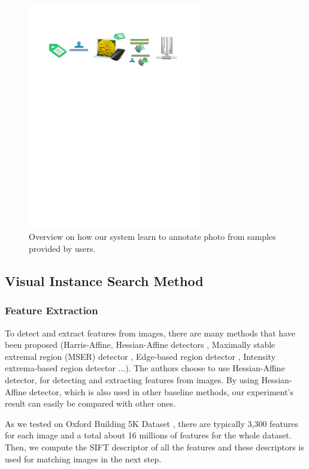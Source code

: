 \begin{figure}
    \centering
    \includegraphics[width=3.0in]{flow2.pdf}
    \caption{Overview on how our system learn to annotate photo from samples provided by users.}
    \label{fig:flow_1}
\end{figure}

\subsection{Visual Instance Search Method} \label{section:visual_search}
\subsubsection{Feature Extraction} \label{section:feature_extraction}

To detect and extract features from images, there are many methods that have been proposed (Harris-Affine, Hessian-Affine detectors \cite{Mikolajczyk2004}, Maximally stable extremal region (MSER) detector \cite{conf/bmvc/MatasCUP02}, Edge-based region detector \cite{Tuytelaars99content-basedimage}, Intensity extrema-based region detector \cite{Tuytelaars00widebaseline} ...). The authors choose to use Hessian-Affine detector, for detecting and extracting features from images. By using Hessian-Affine detector, which is also used in other baseline methods, our experiment's result can easily be compared with other ones.

As we tested on Oxford Building 5K Dataset \cite{oxbuilding}, there are typically 3,300 features for each image and a total about 16 millions of features for the whole dataset. Then, we compute the SIFT descriptor \cite{Lowe2004} of all the features and these descriptors is used for matching images in the next step.

